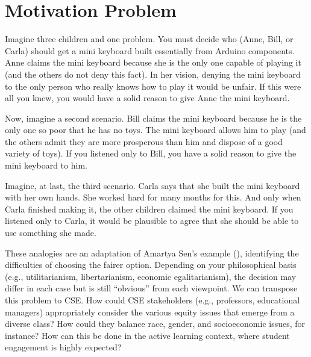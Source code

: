 \section{Motivation Problem}
\label{intro-sec:mot-prob}

Imagine three children and one problem. You must decide who (Anne, Bill, or Carla) should get a mini keyboard built essentially from Arduino components. Anne claims the mini keyboard because she is the only one capable of playing it (and the others do not deny this fact). In her vision, denying the mini keyboard to the only person who really knows how to play it would be unfair. If this were all you knew, you would have a solid reason to give Anne the mini keyboard. 

Now, imagine a second scenario. Bill claims the mini keyboard because he is the only one so poor that he has no toys. The mini keyboard allows him to play (and the others admit they are more prosperous than him and dispose of a good variety of toys). If you listened only to Bill, you have a solid reason to give the mini keyboard to him. 

Imagine, at last, the third scenario. Carla says that she built the mini keyboard with her own hands. She worked hard for many months for this. And only when Carla finished making it, the other children claimed the mini keyboard. If you listened only to Carla, it would be plausible to agree that she should be able to use something she made.

These analogies are an adaptation of Amartya Sen’s example (\citeyear{sen:2009}), identifying the difficulties of choosing the fairer option. Depending on your philosophical basis (e.g., utilitarianism, libertarianism, economic egalitarianism), the decision may differ in each case but is still ``obvious'' from each viewpoint. We can transpose this problem to \acrfull{CSE}. How could \gls{CSE} stakeholders (e.g., professors, educational managers) appropriately consider the various equity issues that emerge from a diverse class? How could they balance race, gender, and socioeconomic issues, for instance? How can this be done in the active learning context, where student engagement is highly expected?